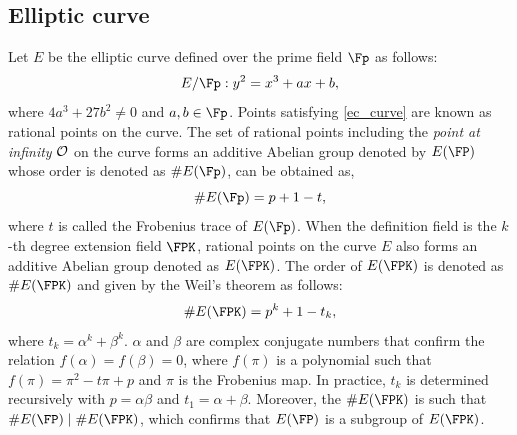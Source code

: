 \subsection{Elliptic curve \cite{washington2003elliptic}}
Let $E$ be the elliptic curve defined over the prime field $\Fp$  as follows:
\begin{equation}\label{ec_curve}
E/\Fp : y^2=x^3+ax+b,
\end{equation}
where $ 4a^3+27b^2 \neq 0$ and $a,b \in \Fp$. Points satisfying \eqref{ec_curve} are known as rational points on the curve.
The set of rational points including the \textit{point at infinity} $\cal{O}$ on the curve forms an additive Abelian group denoted by $E(\FP)$ whose  order is denoted as $\#E(\Fp)$, can be obtained as,
\begin{equation}\label{order}
\#E(\Fp) = p+1-t,
\end{equation} 
where $t$ is called the Frobenius trace of $E(\Fp)$.
When the definition field is the $k$-th degree extension field $\FPK$, rational points on the curve $E$ also forms an additive Abelian group denoted as $E(\FPK)$. The order of $E(\FPK)$ is denoted as $\#E(\FPK)$ and given by the  Weil’s theorem \cite{DBLP:reference/crc/2005ehcc} as follows:
\begin{equation}
\#E(\FPK) = p^k +1- t_k,
\end{equation}
where $t_k =  \alpha^k + \beta^k$.  $\alpha$ and $\beta$ are  complex conjugate numbers that confirm the relation $f(\alpha) = f(\beta) = 0$,  where $f(\pi)$ is a polynomial such that $f(\pi) = \pi^2 -t\pi + p$ and $\pi$ is the Frobenius map. In practice, $t_k$ is determined recursively with $p = \alpha\beta$ and $t_1 = \alpha + \beta$. Moreover, the  $\#E(\FPK)$ is such that $\#E(\FP)\mid \#E(\FPK)$, which confirms that  $E(\FP)$ is a subgroup of $E(\FPK)$.

